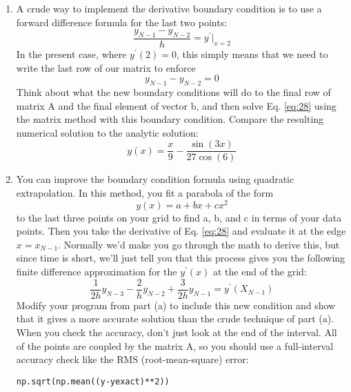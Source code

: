 \begin{enumerate}[label=(\alph*)]
\item	A crude way to implement the derivative boundary condition is to use a forward difference formula for the last two points:
	\begin{equation*}
		\frac{y_{N-1}-y_{N-2}}{h} = y^\prime\vert_{x=2}
	\end{equation*}
	In the present case, where $y^\prime(2) = 0$, this simply means that we need to write the last row of our matrix to enforce
	\begin{equation*}
		y_{N-1}-y_{N-2}= 0
	\end{equation*}
	Think about what the new boundary conditions will do to the final row of matrix A and the final element of vector b, and then solve Eq. \eqref{eq:28} using the matrix method with this boundary condition. Compare the resulting numerical solution to the analytic solution:
	\begin{equation*}
		y(x) = \frac{x}{9} - \frac{\sin(3x)}{27\cos(6)}
	\end{equation*}
	\item You can improve the boundary condition formula using quadratic extrapolation. In this method, you fit a parabola of the form
	\begin{equation}\label{eq:29}
		y(x) = a+bx+cx^2
	\end{equation}
	to the last three points on your grid to find a, b, and c in terms of your data points. Then you take the derivative of Eq. \eqref{eq:28} and evaluate it at
the edge $x = x_{N−1}$. Normally we\rq d make you go through the math to
derive this, but since time is short, we\rq ll just tell you that this process
gives you the following finite difference approximation for the $y^\prime(x)$ at
the end of the grid:
	\begin{equation}\label{eq:210}
		\frac{1}{2h} y_{N-3} - \frac{2}{h} y_{N-2} + \frac{3}{2h} y_{N-1} = y^\prime(X_{N-1})
	\end{equation}
Modify your program from part (a) to include this new condition and
show that it gives a more accurate solution than the crude technique of
part (a). When you check the accuracy, don\rq t just look at the end of the
interval. All of the points are coupled by the matrix A, so you should
use a full-interval accuracy check like the RMS (root-mean-square)
error:
\begin{lstlisting}
np.sqrt(np.mean((y-yexact)**2))
\end{lstlisting}
\end{enumerate}


